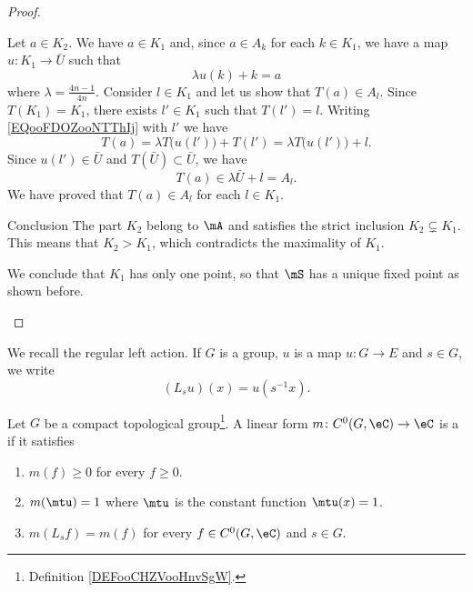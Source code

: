\begin{proof}
\begin{subproof}
\begin{subproof}
        Let \( a\in K_2\). We have \( a\in K_1\) and, since \( a\in A_k\) for each \( k\in K_1\), we have a map \( u\colon K_1\to \bar U\) such that
        \begin{equation}        \label{EQooFDOZooNTThIj}
            \lambda u(k)+k=a
        \end{equation}
        where \( \lambda=\frac{ 4n-1 }{ 4n }\). 
        Consider \( l\in K_1\) and let us show that \( T(a)\in A_{l}\). Since \( T(K_1)=K_1\), there exists \( l'\in K_1\) such that \( T(l')=l\). Writing \eqref{EQooFDOZooNTThIj} with \( l'\) we have
        \begin{equation}
            T(a)=\lambda T\big( u(l') \big)+T(l')=\lambda T\big( u(l') \big)+l.
        \end{equation}
        Since \( u(l')\in \bar U\) and \( T(\bar U)\subset \bar U\), we have
        \begin{equation}
            T(a)\in \lambda\bar U+l=A_l.
        \end{equation}
        We have proved that \( T(a)\in A_l\) for each \( l\in K_1\).
        \end{subproof}
    \item[Conclusion]
        The part \( K_2\) belong to \( \mA\) and satisfies the strict inclusion \( K_2\subsetneq K_1\). This means that \( K_2>K_1\), which contradicts the maximality of \( K_1\).

        We conclude that \( K_1\) has only one point, so that \( \mS\) has a unique fixed point as shown before.
    \end{subproof}
\end{proof}

We recall the regular left action. If \( G\) is a group, \( u\) is a map \( u\colon G\to E\) and \( s\in G\), we write
\begin{equation}
    (L_su)(x)=u(s^{-1}x).
\end{equation}

\begin{definition}        \label{DEFooSBRZooUbzMnN}
    Let \( G\) be a compact topological group\footnote{Definition \ref{DEFooCHZVooHnvSgW}.}. A linear form \( m\colon C^0(G,\eC)\to \eC\) is a  if it satisfies
    \begin{enumerate}
        \item
            \( m(f)\geq 0\) for every \( f\geq 0\).
        \item
            \( m(\mtu)=1\) where \( \mtu\) is the constant function \( \mtu(x)=1\).
        \item
            \( m(L_sf)=m(f)\) for every \( f\in C^0(G,\eC)\) and \( s\in G\).
    \end{enumerate}
\end{definition}

